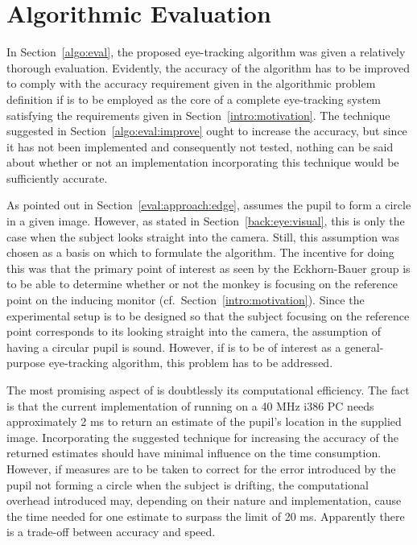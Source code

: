 
\section{Algorithmic Evaluation}
\label{concl:algo}

In Section~\ref{algo:eval}, the proposed eye-tracking algorithm
{\octopus} was given a relatively thorough evaluation.  Evidently, the
accuracy of the algorithm has to be improved to comply with the
accuracy requirement given in the algorithmic problem definition if
{\octopus} is to be employed as the core of a complete eye-tracking
system satisfying the requirements given in
Section~\ref{intro:motivation}.  The technique suggested in
Section~\ref{algo:eval:improve} ought to increase the accuracy, but
since it has not been implemented and consequently not tested, nothing
can be said about whether or not an implementation incorporating this
technique would be sufficiently accurate.

As pointed out in Section~\ref{eval:approach:edge}, {\octopus} assumes
the pupil to form a circle in a given image.  However, as stated in
Section~\ref{back:eye:visual}, this is only the case when the subject
looks straight into the camera.  Still, this assumption was chosen as
a basis on which to formulate the algorithm.  The incentive for doing
this was that the primary point of interest as seen by the
Eckhorn-Bauer group is to be able to determine whether or not the
monkey is focusing on the reference point on the inducing monitor
(cf.\ Section~\ref{intro:motivation}).  Since the experimental setup
is to be designed so that the subject focusing on the reference point
corresponds to its looking straight into the camera, the assumption of
having a circular pupil is sound.  However, if {\octopus} is to be of
interest as a general-purpose eye-tracking algorithm, this problem has
to be addressed.

The most promising aspect of {\octopus} is doubtlessly its
computational efficiency.  The fact is that the current implementation
of {\octopus} running on a 40 MHz i386 PC needs approximately 2 ms to
return an estimate of the pupil's location in the supplied image.
Incorporating the suggested technique for increasing the accuracy of
the returned estimates should have minimal influence on the time
consumption.  However, if measures are to be taken to correct for the
error introduced by the pupil not forming a circle when the subject is
drifting, the computational overhead introduced may, depending on
their nature and implementation, cause the time needed for one
estimate to surpass the limit of 20 ms.  Apparently there is a
trade-off between accuracy and speed.
